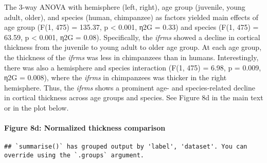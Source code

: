 \documentclass[
]{article}
\newenvironment{Shaded}{\begin{snugshade}}{\end{snugshade}}
\newcommand{\CommentTok}[1]{\textcolor[rgb]{0.56,0.35,0.01}{\textit{#1}}}
\newcommand{\DataTypeTok}[1]{\textcolor[rgb]{0.13,0.29,0.53}{#1}}
\newcommand{\KeywordTok}[1]{\textcolor[rgb]{0.13,0.29,0.53}{\textbf{#1}}}
\newcommand{\NormalTok}[1]{#1}
\newcommand{\OperatorTok}[1]{\textcolor[rgb]{0.81,0.36,0.00}{\textbf{#1}}}
\newcommand{\StringTok}[1]{\textcolor[rgb]{0.31,0.60,0.02}{#1}}
\begin{document}
The 3-way ANOVA with hemisphere (left, right), age group (juvenile,
young adult, older), and species (human, chimpanzee) as factors yielded
main effects of age group (F(1, 475) = 135.37, p \textless{} 0.001, η2G
= 0.33) and species (F(1, 475) = 63.59, p \textless{} 0.001, η2G =
0.08). Specifically, the \emph{ifrms} showed a decline in cortical
thickness from the juvenile to young adult to older age group. At each
age group, the thickness of the \emph{ifrms} was less in chimpanzees
than in humans. Interestingly, there was also a hemisphere and species
interaction (F(1, 475) = 6.98, p = 0.009, η2G = 0.008), where the
\emph{ifrms} in chimpanzees was thicker in the right hemisphere. Thus,
the \emph{ifrms} shows a prominent age- and species-related decline in
cortical thickness across age groups and species. See Figure 8d in the
main text or in the plot below.

\hypertarget{figure-8d-normalized-thickness-comparison}{%
\paragraph{Figure 8d: Normalized thickness
comparison}\label{figure-8d-normalized-thickness-comparison}}

\begin{Shaded}
\end{Shaded}

\begin{verbatim}
## `summarise()` has grouped output by 'label', 'dataset'. You can override using the `.groups` argument.
\end{verbatim}

\begin{Shaded}
\end{Shaded}
\end{document}

